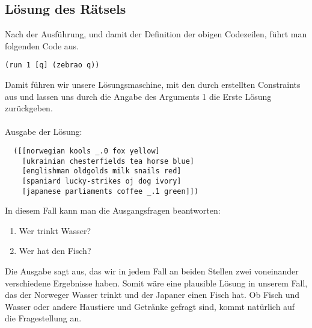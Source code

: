 \subsection{Lösung des Rätsels}

Nach der Ausführung, und damit der Definition der obigen Codezeilen, führt man folgenden Code aus.

\begin{lstlisting}
(run 1 [q] (zebrao q))
\end{lstlisting}
Damit führen wir unsere Lösungsmaschine, mit den durch  erstellten Constraints aus und lassen uns durch die Angabe des Arguments \dq{}1\dq{} die Erste Lösung zurückgeben.
\\
\\
Ausgabe der Lösung:

\begin{lstlisting}
  ([[norwegian kools _.0 fox yellow]
    [ukrainian chesterfields tea horse blue]
    [englishman oldgolds milk snails red]
    [spaniard lucky-strikes oj dog ivory]
    [japanese parliaments coffee _.1 green]])
\end{lstlisting}
In diesem Fall kann man die Ausgangsfragen beantworten:

\begin{enumerate}
  \item Wer trinkt Wasser?
  \item Wer hat den Fisch?
\end{enumerate}
Die Ausgabe sagt aus, das wir in jedem Fall an beiden Stellen zwei voneinander verschiedene Ergebnisse haben. Somit wäre eine plausible Lösung in unserem Fall, das der Norweger Wasser trinkt und der Japaner einen Fisch hat. Ob Fisch und Wasser oder andere Haustiere und Getränke gefragt sind, kommt natürlich auf die Fragestellung an.
